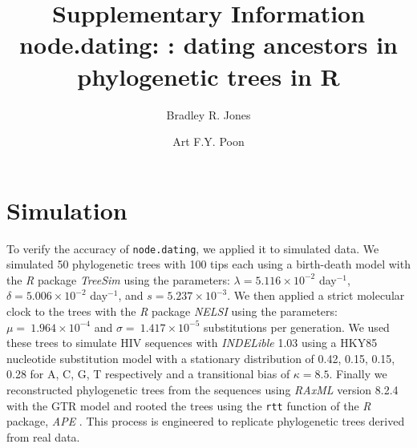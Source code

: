 \documentclass[12pt]{article}
\newcommand{\code}[1]{{\tt #1}}
\begin{document}
\title{Supplementary Information \\ node.dating: : dating ancestors in phylogenetic trees in R}

\author[1,2,*]{Bradley R. Jones}
\author[2,3]{Art F.Y. Poon}

\date{}

\maketitle

\section{Simulation} \label{sec:sim}
To verify the accuracy of \code{node.dating}, we applied it to simulated data.
We simulated 50 phylogenetic trees with 100 tips each using a birth-death model with the \emph{R} package \emph{TreeSim} \citep{TreeSim} using the parameters: $\lambda = 5.116 \times 10^{-2}$ day$^{-1}$, $\delta = 5.006 \times 10^{-2}$ day$^{-1}$, and $s = 5.237 \times 10^{-3}$.
We then applied a strict molecular clock to the trees with the \emph{R} package \emph{NELSI} \citep{NELSI} using the parameters: $\mu = \ 1.964\times 10^{-4}$ and $\sigma = \ 1.417\times 10^{-5}$ substitutions per generation.
We used these trees to simulate HIV sequences with \emph{INDELible} 1.03 \citep{Indelible09} using a HKY85 nucleotide substitution model \cite{HKY85} with a stationary distribution of 0.42, 0.15, 0.15, 0.28 for A, C, G, T respectively and a transitional bias of $\kappa = 8.5$.
Finally we reconstructed phylogenetic trees from the sequences using \emph{RAxML} version 8.2.4 \citep{Raxml14} with the GTR model and rooted the trees using the \code{rtt} function of the \emph{R} package, \emph{APE} \citep{APE}.
This process is engineered to replicate phylogenetic trees derived from real data.
\end{document}

